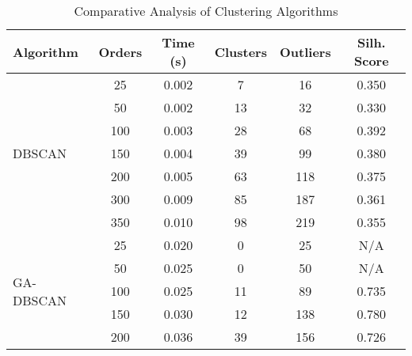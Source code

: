 \begin{table}[htbp]
    \centering
    \setlength{\tabcolsep}{3pt}
    \caption{Comparative Analysis of Clustering Algorithms}
    \label{tab:perf-vc}
    \begin{tabular}{lccccc}
        \toprule
        \textbf{Algorithm} & \textbf{Orders} & \textbf{Time (s)} & \textbf{Clusters} & \textbf{Outliers} & \textbf{Silh. Score} \\
        \midrule
        \multirow{7}{*}{DBSCAN}
                           & 25              & 0.002             & 7                 & 16                & 0.350                \\
                           & 50              & 0.002             & 13                & 32                & 0.330                \\
                           & 100             & 0.003             & 28                & 68                & 0.392                \\
                           & 150             & 0.004             & 39                & 99                & 0.380                \\
                           & 200             & 0.005             & 63                & 118               & 0.375                \\
                           & 300             & 0.009             & 85                & 187               & 0.361                \\
                           & 350             & 0.010             & 98                & 219               & 0.355                \\
        \midrule
        \multirow{7}{*}{GA-DBSCAN}
                           & 25              & 0.020             & 0                 & 25                & N/A                  \\
                           & 50              & 0.025             & 0                 & 50                & N/A                  \\
                           & 100             & 0.025             & 11                & 89                & 0.735                \\
                           & 150             & 0.030             & 12                & 138               & 0.780                \\
                           & 200             & 0.036             & 39                & 156               & 0.726                \\

\end{tabular}
\end{table}

